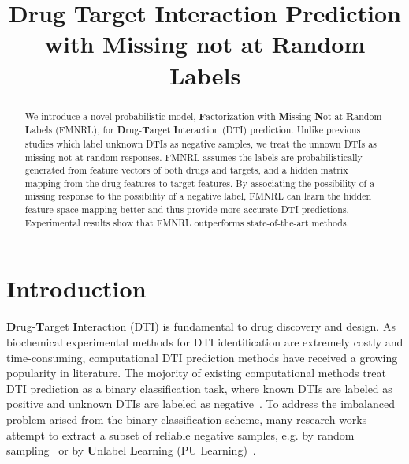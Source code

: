 \documentclass[sigconf,anonymous]{acmart}
\begin{document}
\title{Drug Target Interaction Prediction with Missing not at Random Labels}

\begin{abstract}
We introduce a novel probabilistic model, \textbf{F}actorization with \textbf{M}issing \textbf{N}ot at \textbf{R}andom \textbf{L}abels (FMNRL), for \textbf{D}rug-\textbf{T}arget \textbf{I}nteraction (DTI) prediction. Unlike previous studies which label unknown DTIs as negative samples, we treat the unnown DTIs as missing not at random responses. FMNRL assumes the labels are probabilistically generated from feature vectors of both drugs and targets, and a hidden matrix mapping from the drug features to target features. By associating the possibility of a missing response to the possibility of a negative label, FMNRL can learn the hidden feature space mapping better and thus provide more accurate DTI predictions. Experimental results show that FMNRL outperforms state-of-the-art methods. 

\end{abstract}



\maketitle
\section{Introduction}\label{sec:introduction}
\textbf{D}rug-\textbf{T}arget \textbf{I}nteraction (DTI) is fundamental to drug discovery and design. As biochemical experimental methods for DTI identification are extremely costly and time-consuming, computational DTI prediction methods have received a growing popularity in literature. The mojority of existing computational methods treat DTI prediction as a binary classification task, where known DTIs are labeled as positive and unknown DTIs are labeled as negative~\cite{Ding2013Similarity}. To address the imbalanced problem arised from the binary classification scheme, many research works attempt to extract a subset of reliable negative samples, e.g. by random sampling~\cite{Luo2017Network} or by \textbf{U}nlabel \textbf{L}earning (PU Learning)~\cite{Peng2017Screening}. 
\end{document}
